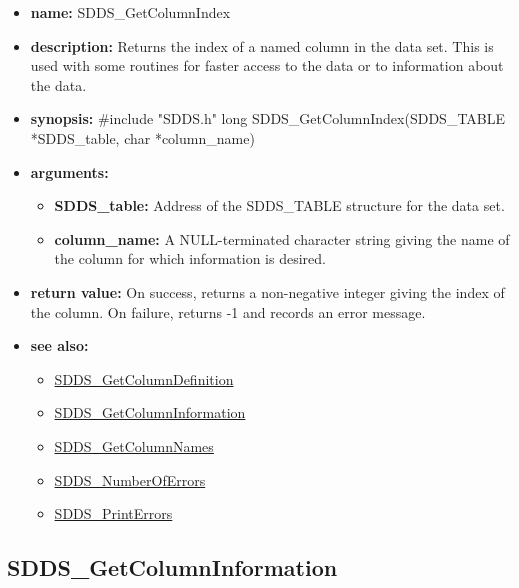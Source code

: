 \documentclass[11pt]{article}
\newcommand{\progref}[1]{\hyperref{SDDS_#1}{{\tt SDDS\_#1} (}{)}{SDDS_#1}}
\begin{document}
\begin{itemize}
\item {\bf name:}\newline
SDDS\_GetColumnIndex
\item {\bf description:}\newline
Returns the index of a named column in the data set. This is used with some routines for faster access to the data or to information about the data.
\item {\bf synopsis:} \#include "SDDS.h"\newline
long SDDS\_GetColumnIndex(SDDS\_TABLE *SDDS\_table, char *column\_name)
\item {\bf arguments:}
\begin{itemize}
\item {\bf SDDS\_table:} Address of the SDDS\_TABLE structure for the data set.
\item {\bf column\_name:} A NULL-terminated character string giving the name of the column for which information is desired.
\end{itemize}
\item {\bf return value:}\newline
On success, returns a non-negative integer giving the index of the column. On failure, returns -1 and records an error message.
\item {\bf see also:}
\begin{itemize}
\item \progref{GetColumnDefinition}
\item \progref{GetColumnInformation}
\item \progref{GetColumnNames}
\item \progref{NumberOfErrors}
\item \progref{PrintErrors}
\end{itemize}
\end{itemize}

\subsection{SDDS\_GetColumnInformation}
\label{SDDS_GetColumnInformation}
\end{document}
